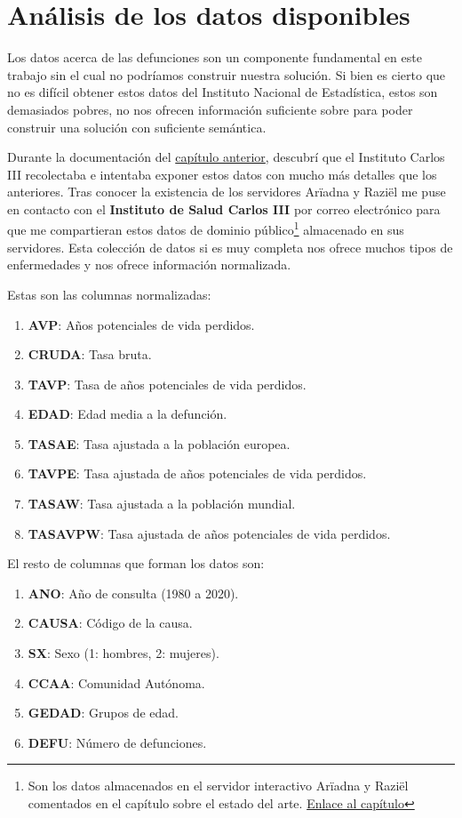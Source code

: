 \chapter{Análisis de los datos disponibles}
\label{cap:5}
Los datos acerca de las defunciones son un componente fundamental en este trabajo sin el
cual no podríamos construir nuestra solución. Si bien es cierto que no es difícil obtener
estos datos del Instituto Nacional de Estadística, estos son demasiados pobres, no nos
ofrecen información suficiente sobre para poder construir una solución con suficiente
semántica.

Durante la documentación del \hyperref[sec:estadoArte]{capítulo anterior}, descubrí que el
Instituto Carlos III recolectaba e intentaba exponer estos datos con mucho más detalles
que los anteriores. Tras conocer la existencia de los servidores Arïadna y Raziël me puse
en contacto con el \textbf{Instituto de Salud Carlos III} por correo electrónico para que
me compartieran estos datos de dominio público\footnote{Son los datos almacenados en el
servidor interactivo Arïadna y Raziël comentados en el capítulo sobre el estado del arte.
\hyperref[sec:estadoArte]{Enlace al capítulo}} almacenado en sus servidores. Esta
colección de datos si es muy completa nos ofrece muchos tipos de enfermedades y nos ofrece
información normalizada.

Estas son las columnas normalizadas:
\begin{enumerate}
\item \textbf{AVP}: Años potenciales de vida perdidos.
\item \textbf{CRUDA}: Tasa bruta.
\item \textbf{TAVP}: Tasa de años potenciales de vida perdidos.
\item \textbf{EDAD}: Edad media a la defunción.
\item \textbf{TASAE}: Tasa ajustada a la población europea.
\item \textbf{TAVPE}: Tasa ajustada de años potenciales de vida perdidos.
\item \textbf{TASAW}: Tasa ajustada a la población mundial.
\item \textbf{TASAVPW}: Tasa ajustada de años potenciales de vida perdidos.
\end{enumerate}

El resto de columnas que forman los datos son:
\begin{enumerate}
\item \textbf{ANO}: Año de consulta (1980 a 2020).
\item \textbf{CAUSA}: Código de la causa.
\item \textbf{SX}: Sexo (1: hombres, 2: mujeres).
\item \textbf{CCAA}: Comunidad Autónoma.
\item \textbf{GEDAD}: Grupos de edad.
\item \textbf{DEFU}: Número de defunciones.
\end{enumerate}


